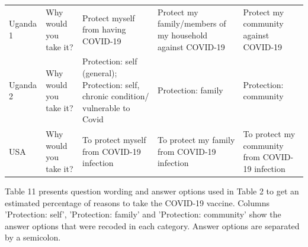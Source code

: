 \documentclass[
  12pt,
]{article}
\begin{document}
\begin{table}[!h]
{\begin{threeparttable}
\begin{tabular}[t]{>{\raggedright\arraybackslash}p{8em}>{\raggedright\arraybackslash}p{8em}>{\raggedright\arraybackslash}p{10em}>{\raggedright\arraybackslash}p{10em}>{\raggedright\arraybackslash}p{10em}}
Uganda 1 & Why would you take it? & Protect myself from having COVID-19 & Protect my family/members of my household against COVID-19 & Protect my community against COVID-19\\
Uganda 2 & Why would you take it? & Protection: self (general); Protection: self, chronic condition/ vulnerable to Covid & Protection: family & Protection: community\\
USA & Why would you take it? & To protect myself from COVID-19 infection & To protect my family from COVID-19 infection & To protect my community from COVID-19 infection\\
\bottomrule
\end{tabular}
\begin{tablenotes}
\item Table 11 presents question wording and answer options used in Table 2 to get an estimated percentage of reasons to take the COVID-19 vaccine. Columns 'Protection: self', 'Protection: family' and  'Protection: community' show the answer options that were recoded in each category. Answer options are separated by a semicolon.
\end{tablenotes}
\end{threeparttable}}
\end{table}
\end{document}

